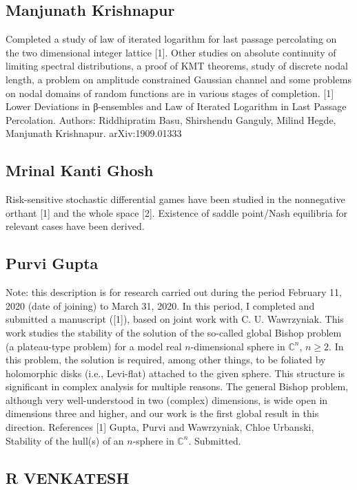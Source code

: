 \subsection{Manjunath Krishnapur}

Completed a study of law of iterated logarithm for last passage percolating on the two dimensional integer lattice [1]. Other studies on absolute continuity of limiting spectral distributions, a proof of KMT theorems, study of discrete nodal length, a problem on amplitude constrained Gaussian channel and some problems on nodal domains of random functions are in various stages of completion.  [1] Lower Deviations in β-ensembles and Law of Iterated Logarithm in Last Passage Percolation.   Authors: Riddhipratim Basu, Shirshendu Ganguly, Milind Hegde, Manjunath Krishnapur. arXiv:1909.01333


\subsection{Mrinal Kanti Ghosh}

Risk-sensitive stochastic differential games have been studied in the nonnegative orthant [1] and the whole space [2]. Existence of saddle point/Nash equilibria for relevant cases have been derived.


\subsection{Purvi Gupta}

Note: this description is for research carried out during the period February 11, 2020 (date of joining) to March 31, 2020.   In this period,  I completed and submitted a manuscript ([1]),  based on joint work with C. U. Wawrzyniak. This work studies the stability of the solution of the so-called global Bishop problem (a plateau-type problem) for a model real $n$-dimensional sphere in $\mathbb{C}^n$, $n\geq 2$. In this problem, the solution is required, among other things, to be foliated by holomorphic disks (i.e., Levi-flat) attached to the given sphere. This structure is significant in complex analysis for multiple reasons. The general Bishop problem, although very well-understood in two (complex) dimensions, is wide open in dimensions three and higher, and our work is the first global result in this direction.    References [1] Gupta, Purvi and Wawrzyniak, Chloe Urbanski, Stability of the hull(s) of an $n$-sphere in $\mathbb{C}^n$. Submitted.


\subsection{R VENKATESH}

